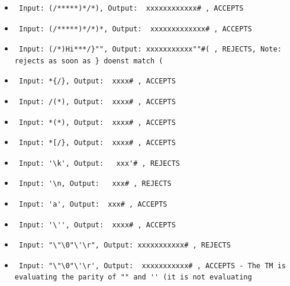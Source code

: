 \documentclass{article}
\begin{document}
{{\begin{itemize}
    \item \begin{verbatim} Input: (/*****)*/*), Output:  xxxxxxxxxxxx# , ACCEPTS \end{verbatim}
    \item \begin{verbatim} Input: (/*****)*/*)*, Output:  xxxxxxxxxxxxx# , ACCEPTS \end{verbatim}
    \item \begin{verbatim} Input: (/*)Hi***/}"", Output: xxxxxxxxxxx""#( , REJECTS, Note: rejects as soon as } doenst match ( \end{verbatim}
    \item \begin{verbatim} Input: *{/}, Output:  xxxx# , ACCEPTS \end{verbatim}
    \item \begin{verbatim} Input: /(*), Output:  xxxx# , ACCEPTS \end{verbatim}
    \item \begin{verbatim} Input: *(*), Output:  xxxx# , ACCEPTS \end{verbatim}
    \item \begin{verbatim} Input: *[/}, Output:  xxxx# , ACCEPTS \end{verbatim}
    \item \begin{verbatim} Input: '\k', Output:   xxx'# , REJECTS \end{verbatim}
    \item \begin{verbatim} Input: '\n, Output:   xxx# , REJECTS \end{verbatim}
    \item \begin{verbatim} Input: 'a', Output:  xxx# , ACCEPTS \end{verbatim}
    \item \begin{verbatim} Input: '\'', Output:  xxxx# , ACCEPTS \end{verbatim}
    \item \begin{verbatim} Input: "\"\0"\'\r", Output: xxxxxxxxxxx# , REJECTS \end{verbatim}
    \item \begin{verbatim} Input: "\"\0"\'\r', Output:  xxxxxxxxxxx# , ACCEPTS - The TM is evaluating the parity of "" and '' (it is not evaluating 

\end{verbatim}
\end{itemize}}}
\end{document}
